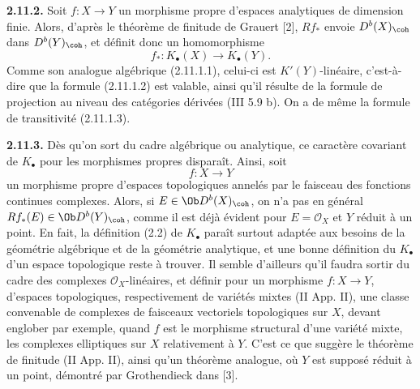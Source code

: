 \documentclass[11pt]{article}
\begin{document}
\textbf{2.11.2.} Soit \(f:X\to Y\) un morphisme propre d'espaces analytiques de dimension finie. Alors, d'après le théorème de finitude de Grauert [2], \(Rf_*\) envoie \(D^b(X)_{\coh}\) dans \(D^b(Y)_{\coh}\), et définit donc un homomorphisme
\begin{equation}\tag{2.11.2.1}
 f_*:K_{\bullet}(X)\longrightarrow K_{\bullet}(Y).
\end{equation}
Comme son analogue algébrique (2.11.1.1), celui-ci est \(K'(Y)\)-linéaire, c'est-à-dire que la formule (2.11.1.2) est valable, ainsi qu'il résulte de la formule de projection au niveau des catégories dérivées (III 5.9 b). On a de même la formule de transitivité (2.11.1.3).

\textbf{2.11.3.} Dès qu'on sort du cadre algébrique ou analytique, ce caractère covariant de \(K_{\bullet}\) pour les morphismes propres disparaît. Ainsi, soit
\[
 f:X\to Y
\]
un morphisme propre d'espaces topologiques annelés par le faisceau des fonctions continues complexes. Alors, si \(E\in\Ob D^b(X)_{\coh}\), on n'a pas en général \(Rf_*(E)\in\Ob D^b(Y)_{\coh}\), comme il est déjà évident pour \(E=\mathcal O_X\) et \(Y\) réduit à un point. En fait, la définition (2.2) de \(K_{\bullet}\) paraît surtout adaptée aux besoins de la géométrie algébrique et de la géométrie analytique, et une bonne définition du \(K_{\bullet}\) d'un espace topologique reste à trouver. Il semble d'ailleurs qu'il faudra sortir du cadre des complexes \(\mathcal O_X\)-linéaires, et définir pour un morphisme \(f:X\to Y\), d'espaces topologiques, respectivement de variétés mixtes (II App. II), une classe convenable de complexes de faisceaux vectoriels topologiques sur \(X\), devant englober par exemple, quand \(f\) est le morphisme structural d'une variété mixte, les complexes elliptiques sur \(X\) relativement à \(Y\). C'est ce que suggère le théorème de finitude (II App. II), ainsi qu'un théorème analogue, où \(Y\) est supposé réduit à un point, démontré par Grothendieck dans [3].
\end{document}

